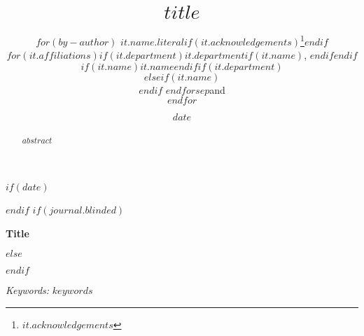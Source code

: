 

\def\spacingset#1{\renewcommand{\baselinestretch}%
{#1}\small\normalsize} \spacingset{1}



$if(date)$
\date{$date$}
$endif$
$if(journal.blinded)$
\bigskip
\bigskip
\bigskip
\begin{center}
  {\LARGE\bf Title}
\end{center}
\medskip
$else$
\title{\bf $title$}
\author{
$for(by-author)$
$it.name.literal$$if(it.acknowledgements)$\thanks{$it.acknowledgements$}$endif$\\
$for(it.affiliations)$$if(it.department)$$it.department$$if(it.name)$, $endif$$endif$$if(it.name)$$it.name$$endif$$if(it.department)$\\$elseif(it.name)$\\$endif$
$endfor$$sep$and\\$endfor$}
\maketitle
$endif$
\bigskip
\begin{abstract}
$abstract$
\end{abstract}

\noindent%
{\it Keywords:} $keywords$
\vfill

\newpage
\spacingset{1.9} %

